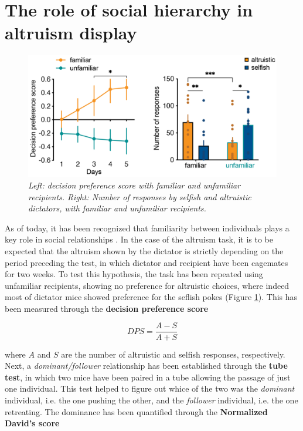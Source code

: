 \documentclass[12pt, a4paper]{report}
\begin{document}
\section{The role of social hierarchy in altruism display}

\begin{figure}[H]
	\begin{center}
		\includegraphics[scale=0.5]{familiar.png} 
	\end{center} 
	\caption{\textit{Left: decision preference score with familiar and unfamiliar recipients. Right: Number of responses by selfish and altruistic dictators, with familiar and unfamiliar recipients.}} \label{familiar}
	
\end{figure}

As of today, it has been recognized that familiarity between individuals plays a key role in social relationships \cite{31}. %
 In the case of the altruism task, it is to be expected that the altruism shown by the dictator is strictly depending on the period preceding the test, in which dictator and recipient have been cagemates for two weeks. To test this hypothesis, the task has been repeated using unfamiliar recipients, showing no preference for altruistic choices, where indeed most of dictator mice showed preference for the seflish pokes (Figure \ref{familiar}). This has been measured through the \textbf{decision preference score} 

\begin{equation}
DPS = \frac{A -S}{A+S}
\end{equation}

where $A$ and $S$ are the number of altruistic and selfish responses, respectively.\\
Next, a \textit{dominant/follower} relationship has been established through the \textbf{tube test}, in which two mice have been paired in a tube allowing the passage of just one individual. This test helped to figure out whice of the two was the \textit{dominant} individual, i.e. the one pushing the other, and the \textit{follower} individual, i.e. the one retreating. The dominance has been quantified through the \textbf{Normalized David's score} \cite{32} %
\end{document}
